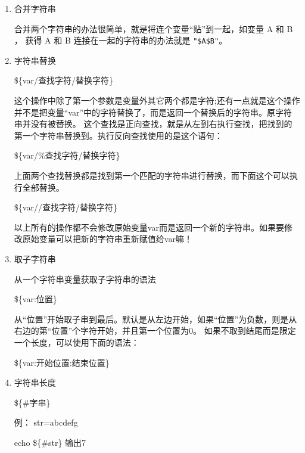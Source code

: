 \documentclass[amstex,twoside]{ctexbook}
\begin{document}
\begin{enumerate}
\item 合并字符串	

合并两个字符串的办法很简单，就是将连个变量“贴”到一起，如变量 A 和 B ， 获得 A 和 B 连接在一起的字符串的办法就是 {\tt "\$A\$B"}。

\item 字符串替换

\$\{var/查找字符/替换字符\}

	这个操作中除了第一个参数是变量外其它两个都是字符;还有一点就是这个操作并不是把变量“var”中的字符替换了，而是返回一个替换后的字符串。原字符串并没有被替换。
这个查找是正向查找，就是从左到右执行查找，把找到的第一个字符串替换到。执行反向查找使用的是这个语句：


\$\{var/\%查找字符/替换字符\}

上面两个查找替换都是找到第一个匹配的字符串进行替换，而下面这个可以执行全部替换。

\$\{var//查找字符/替换字符\}

以上所有的操作都不会修改原始变量var而是返回一个新的字符串。如果要修改原始变量可以把新的字符串重新赋值给var嘛！

\item 取子字符串

从一个字符串变量获取子字符串的语法

\$\{var:位置\}

从“位置”开始取子串到最后。默认是从左边开始，如果“位置”为负数，则是从右边的第“位置”个字符开始，并且第一个位置为0。 %
如果不取到结尾而是限定一个长度，可以使用下面的语法：

\$\{var:开始位置:结束位置\}




\item  字符串长度

\$\{\#字串\} %

例： str=abcdefg

echo \$\{\#str\} 输出7

\end{enumerate}
\end{document}
